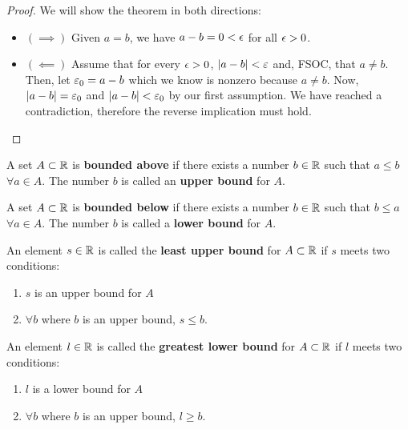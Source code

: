 \begin{proof}
	We will show the theorem in both directions:
	\begin{itemize}
		\item $\left( \implies \right) $ Given $a = b$, we have $a - b = 0 < \eps$ for all $\eps > 0$.
		\item $\left( \impliedby \right)$ Assume that for every $\eps > 0$, $\left|a-b\right| < \e$ and, FSOC, that $a \neq b$. Then, let $\e_0 = a-b$ which we know is nonzero because $a \neq b$. Now, $\left|a-b\right| = \e_0$ and $\left|a-b\right| < \e_0$ by our first assumption. We have reached a contradiction, therefore the reverse implication must hold.
	\end{itemize}	
\end{proof}

\begin{definition}
       A set $A \subset \mathbb{R}$ is \textbf{bounded above} if there exists a number $b \in \mathbb{R}$ such that $a \le b$ $\forall a \in A$. The number $b$ is called an \textbf{upper bound} for $A$.
 \end{definition}
 
  
 \begin{definition}
         A set $A \subset \mathbb{R}$ is \textbf{bounded below} if there exists a number $b \in \mathbb{R}$ such that $b \le a$ $\forall a \in A$. The number $b$ is called a \textbf{lower bound} for $A$.
 \end{definition}
 
 \begin{definition}
         An element $s \in \mathbb{R}$ is called the \textbf{least upper bound} for $A \subset \mathbb{R}$ if $s$ meets two conditions:
         \begin{enumerate}
                 \item $s$ is an upper bound for $A$
                 \item $\forall b$ where $b$ is an upper bound, $s \le b$.
         \end{enumerate}
 \end{definition}
 
 \begin{definition}
         An element $l \in \mathbb{R}$ is called the \textbf{greatest lower bound} for $A \subset \mathbb{R}$ if $l$ meets two conditions:
         \begin{enumerate}
                 \item $l$ is a lower bound for $A$
 		\item $\forall b$ where $b$ is an upper bound, $l \ge  b$.
\end{enumerate}
\end{definition}


